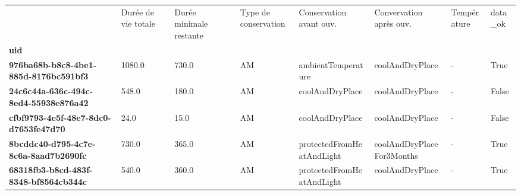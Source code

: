 \begin{tabularx}{\linewidth}{lXXXXXXX}
\toprule
{} &  Durée de vie totale &  Durée minimale restante & Type de conservation &    Conservation avant ouv. &    Convervation après ouv. & Température &  data\_ok \\
\textbf{uid                                 } &                      &                          &                      &                            &                            &             &          \\
\midrule
\textbf{976ba68b-b8c8-4be1-885d-8176bc591bf3} &               1080.0 &                    730.0 &                   AM &         ambientTemperature &            coolAndDryPlace &           - &     True \\
\textbf{24c6c44a-636c-494c-8ed4-55938e876a42} &                548.0 &                    180.0 &                   AM &            coolAndDryPlace &            coolAndDryPlace &           - &    False \\
\textbf{cfbf9793-4e5f-48e7-8dc0-d7653fe47d70} &                 24.0 &                     15.0 &                   AM &            coolAndDryPlace &            coolAndDryPlace &           - &    False \\
\textbf{8bcddc40-d795-4c7e-8c6a-8aad7b2690fc} &                730.0 &                    365.0 &                   AM &  protectedFromHeatAndLight &  coolAndDryPlaceFor3Months &           - &     True \\
\textbf{68318fb3-b8cd-483f-8348-bf8564cb344c} &                540.0 &                    360.0 &                   AM &  protectedFromHeatAndLight &            coolAndDryPlace &           - &     True \\
\bottomrule
\end{tabularx}
